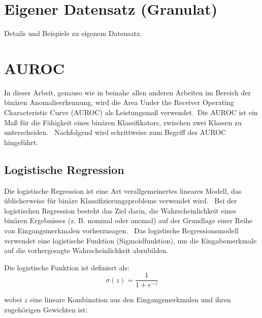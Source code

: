 \section{Eigener Datensatz (Granulat)}\label{sec:EigenerDatensatz}
Details und Beispiele zu eigenem Datensatz.

\section{AUROC\cite{aurcoc}}\label{sec:AUROC}
In dieser Arbeit, genauso wie in beinahe allen anderen Arbeiten im Bereich der binären Anomalieerkennung, wird die \glqq Area Under the Receiver Operating Characteristic Curve\grqq{} (AUROC) als Leistungsmaß verwendet.\ 
Die AUROC ist ein Maß für die Fähigkeit eines binären Klassifikators, zwischen zwei Klassen zu unterscheiden. \
Nachfolgend wird schrittweise zum Begriff des AUROC hingeführt. \
\subsection{Logistische Regression}\label{subsec:LogistischeRegression}
Die logistische Regression ist eine Art verallgemeinertes lineares Modell, das üblicherweise für binäre Klassifizierungsprobleme verwendet wird. \ 
Bei der logistischen Regression besteht das Ziel darin, die Wahrscheinlichkeit eines binären Ergebnisses (z. B. nominal oder anomal) auf der Grundlage einer Reihe von Eingangsmerkmalen vorherzusagen. \ 
Das logistische Regressionsmodell verwendet eine logistische Funktion (\glqq Sigmoidfunktion\grqq{}), um die Eingabemerkmale auf die vorhergesagte Wahrscheinlichkeit abzubilden. \

Die logistische Funktion ist definiert als: \
$$ 
\sigma(z) = \frac{1}{1 + e^{-z}} 
$$

wobei $z$ eine lineare Kombination aus den Eingangsmerkmalen und ihren zugehörigen Gewichten ist: \

